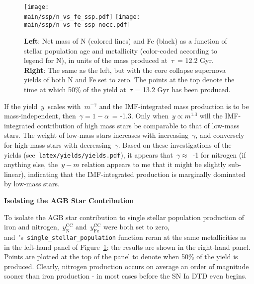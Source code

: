 \documentclass[\main/notes.tex]{subfiles}
\begin{document}
\begin{figure}[t] 
\centering 
\texttt{[image: \\main/ssp/n\_vs\_fe\_ssp.pdf]} 
\texttt{[image: \\main/ssp/n\_vs\_fe\_ssp\_nocc.pdf]} 
\caption{
\textbf{Left}: Net mass of N (colored lines) and Fe (black) as a function of 
stellar population age and metallicity (color-coded according to legend for N), 
in units of the mass produced at~$\tau$~= 12.2 Gyr. 
\textbf{Right}: The same as the left, but with the core collapse supernova 
yields of both N and Fe set to zero. 
The points at the top denote the time at which 50\% of the yield at~$\tau$ = 
13.2 Gyr has been produced. 
} 
\label{fig:n_vs_fe_ssp} 
\end{figure} 

If the yield~$y$~scales with~$m^{-\gamma}$ and the IMF-integrated mass 
production is to be mass-independent, then~$\gamma = 1 - \alpha$~= -1.3. Only 
when~$y \propto m^{1.3}$ will the IMF-integrated contribution of high mass 
stars be comparable to that of low-mass stars. The weight of low-mass stars 
increases with increasing~$\gamma$, and conversely for high-mass stars with 
decreasing~$\gamma$. Based on these investigations of the~\citet{Cristallo2011} 
yields (see~\texttt{latex/yields/yields.pdf}), it appears 
that~$\gamma \approx$~-1 for nitrogen (if anything else, the~$y-m$ relation 
appears to me that it might be slightly sub-linear), indicating that the 
IMF-integrated production is marginally dominated by low-mass stars. 
\par 
\textbf{Isolating the AGB Star Contribution} 
\par\noindent 
To isolate the AGB star contribution to single stellar population production 
of iron and nitrogen,~$y_\text{N}^\text{CC}$ and~$y_\text{Fe}^\text{CC}$ were 
both set to zero, and~\vice's~\texttt{single\_stellar\_population} function 
reran at the same metallicities as in the left-hand panel of 
Figure~\ref{fig:n_vs_fe_ssp}; the results are shown in the right-hand panel. 
Points are plotted at the top of the panel to denote when 50\% of the yield is 
produced. 
Clearly, nitrogen production occurs on average an order of magnitude 
sooner than iron production - in most cases before the SN Ia DTD even begins. 
\end{document}
